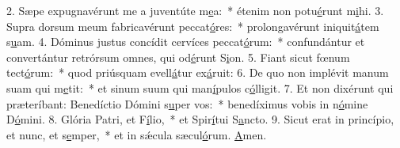 2. Sæpe expugnavérunt me a juventúte m\uline{e}a:~* étenim non potu\uline{é}runt m\uline{i}hi.
3. Supra dorsum meum fabricavérunt peccat\uline{ó}res:~* prolongavérunt iniquit\uline{á}tem s\uline{u}am.
4. Dóminus justus concídit cervíces peccat\uline{ó}rum:~* confundántur et convertántur retrórsum omnes, qui od\uline{é}runt S\uline{i}on.
5. Fiant sicut fœnum tect\uline{ó}rum:~* quod priúsquam evell\uline{á}tur ex\uline{á}ruit:
6. De quo non implévit manum suam qui m\uline{e}tit:~* et sinum suum qui man\uline{í}pulos c\uline{ó}lligit.
7. Et non dixérunt qui præteríbant: Benedíctio Dómini s\uline{u}per vos:~* benedíximus vobis in n\uline{ó}mine D\uline{ó}mini.
8. Glória Patri, et F\uline{í}lio,~* et Spir\uline{í}tui S\uline{a}ncto.
9. Sicut erat in princípio, et nunc, et s\uline{e}mper,~* et in sǽcula sæcul\uline{ó}rum. \uline{A}men.
